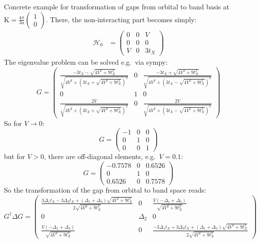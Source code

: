 \documentclass[../notes.tex]{subfiles}
\begin{document}
Concrete example for transformation of gaps from orbital to band basis at \(\mathrm{K} = \frac{4\pi}{3 a} \begin{pmatrix} 1 \\ 0 \end{pmatrix}\).
There, the non-interacting part becomes simply:
\begin{align}
	\mathcal{H}_0 &=
	\begin{pmatrix}
		0 & 0 & V \\
		0 & 0 & 0 \\
		V & 0 & 3 t_X
	\end{pmatrix}
\end{align}
The eigenvalue problem can be solved e.g.~via sympy:
\begin{equation}
	G =
	\begin{pmatrix}
		\frac{- 3 t_{X} - \sqrt{4 V^{2} + 9 t_{X}^{2}}}{\sqrt{4 V^{2} + \left(3 t_{X} + \sqrt{4 V^{2} + 9 t_{X}^{2}}\right)^{2}}} & 0 & \frac{- 3 t_{X} + \sqrt{4 V^{2} + 9 t_{X}^{2}}}{\sqrt{4 V^{2} + \left(3 t_{X} - \sqrt{4 V^{2} + 9 t_{X}^{2}}\right)^{2}}} \\
		0 & 1 & 0 \\
		\frac{2 V}{\sqrt{4 V^{2} + \left(3 t_{X} + \sqrt{4 V^{2} + 9 t_{X}^{2}}\right)^{2}}} & 0 & \frac{2 V}{\sqrt{4 V^{2} + \left(3 t_{X} - \sqrt{4 V^{2} + 9 t_{X}^{2}}\right)^{2}}}
	\end{pmatrix}
\end{equation}
So for \(V \to 0\):
\begin{equation}
	G =
	\begin{pmatrix}
		-1 & 0 & 0 \\
		0 & 1 & 0 \\
		0 & 0 & 1
	\end{pmatrix}
\end{equation}
but for \(V > 0\), there are off-diagonal elements, e.g.~\(V = 0.1\):
\begin{equation}
	G =
	\begin{pmatrix}
		-0.7578 & 0 & 0.6526 \\
		0 & 1 & 0 \\
		0.6526 & 0 & 0.7578
	\end{pmatrix}
\end{equation}
So the transformation of the gap from orbital to band space reads:
\begin{equation}
	G^{\dagger} \Delta G =
	\begin{pmatrix}
		\frac{3 \Delta_{1} t_{X} - 3 \Delta_{3} t_{X} + \left(\Delta_{1} + \Delta_{3}\right) \sqrt{4 V^{2} + 9 t_{X}^{2}}}{2 \sqrt{4 V^{2} + 9 t_{X}^{2}}} & 0 & \frac{V \left(- \Delta_{1} + \Delta_{3}\right)}{\sqrt{4 V^{2} + 9 t_{X}^{2}}} \\
		0 & \Delta_{2} & 0 \\
		\frac{V \left(- \Delta_{1} + \Delta_{3}\right)}{\sqrt{4 V^{2} + 9 t_{X}^{2}}} & 0 & \frac{- 3 \Delta_{1} t_{X} + 3 \Delta_{3} t_{X} + \left(\Delta_{1} + \Delta_{3}\right) \sqrt{4 V^{2} + 9 t_{X}^{2}}}{2 \sqrt{4 V^{2} + 9 t_{X}^{2}}}
	\end{pmatrix}
\end{equation}
\end{document}
